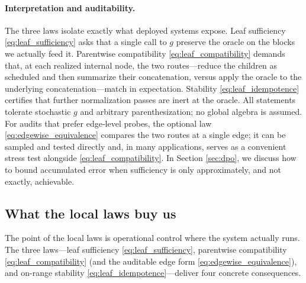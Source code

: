 \documentclass[11pt]{article}
\begin{document}
\paragraph{Interpretation and auditability.}
The three laws isolate exactly what deployed systems expose. Leaf sufficiency \eqref{eq:leaf_sufficiency} asks that a single call to $g$ preserve the oracle on the blocks we actually feed it. Parentwise compatibility \eqref{eq:leaf_compatibility} demands that, at each realized internal node, the two routes—reduce the children as scheduled and then summarize their concatenation, versus apply the oracle to the underlying concatenation—match in expectation. Stability \eqref{eq:leaf_idempotence} certifies that further normalization passes are inert at the oracle. All statements tolerate stochastic $g$ and arbitrary parenthesization; no global algebra is assumed. For audits that prefer edge‑level probes, the optional law \eqref{eq:edgewise_equivalence} compares the two routes at a single edge; it can be sampled and tested directly and, in many applications, serves as a convenient stress test alongside \eqref{eq:leaf_compatibility}. In Section \ref{sec:dpo}, we discuss how to bound accumulated error when sufficiency is only approximately, and not exactly, achievable. 




\subsection{What the local laws buy us}\label{sec:what-local-buys}

The point of the local laws is operational control where the system actually runs. The three laws---leaf sufficiency \eqref{eq:leaf_sufficiency}, parentwise compatibility \eqref{eq:leaf_compatibility} (and the auditable edge form \eqref{eq:edgewise_equivalence}), and on-range stability \eqref{eq:leaf_idempotence}---deliver four concrete consequences.
\end{document}
